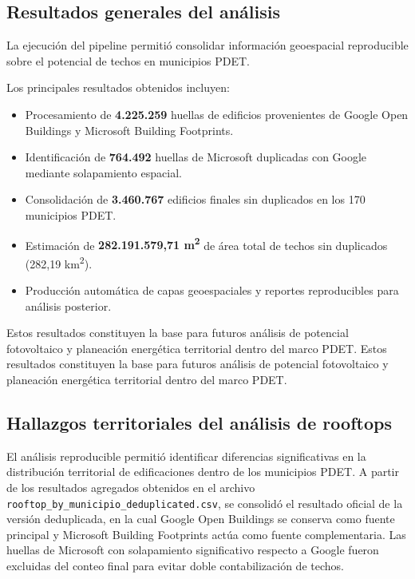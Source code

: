 \documentclass{article}
\begin{document}
\subsection{Resultados generales del análisis}

La ejecución del pipeline permitió consolidar información geoespacial 
reproducible sobre el potencial de techos en municipios PDET.

Los principales resultados obtenidos incluyen:

\begin{itemize}
    \item Procesamiento de \textbf{4.225.259} huellas de edificios 
    provenientes de Google Open Buildings y Microsoft Building Footprints.
    \item Identificación de \textbf{764.492} huellas de Microsoft duplicadas 
    con Google mediante solapamiento espacial.
    \item Consolidación de \textbf{3.460.767} edificios finales sin duplicados 
    en los 170 municipios PDET.
    \item Estimación de \textbf{282.191.579,71 m\textsuperscript{2}} de área 
    total de techos sin duplicados (282,19 km\textsuperscript{2}).
    \item Producción automática de capas geoespaciales y reportes reproducibles 
    para análisis posterior.
\end{itemize}

Estos resultados constituyen la base para futuros análisis de potencial 
fotovoltaico y planeación energética territorial dentro del marco PDET.
Estos resultados constituyen la base para futuros análisis de potencial fotovoltaico y planeación energética territorial dentro del marco PDET.

\subsection{Hallazgos territoriales del análisis de rooftops}

El análisis reproducible permitió identificar diferencias significativas en la 
distribución territorial de edificaciones dentro de los municipios PDET. A partir 
de los resultados agregados obtenidos en el archivo 
\texttt{rooftop\_by\_municipio\_deduplicated.csv}, se consolidó el resultado oficial 
de la versión deduplicada, en la cual Google Open Buildings se conserva como fuente 
principal y Microsoft Building Footprints actúa como fuente complementaria. Las 
huellas de Microsoft con solapamiento significativo respecto a Google fueron excluidas 
del conteo final para evitar doble contabilización de techos.
\end{document}
